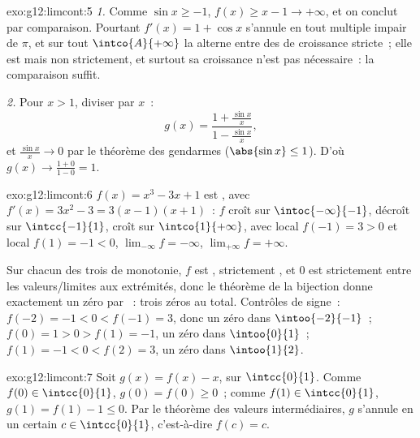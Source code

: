 \begin{solution}{exo:g12:limcont:5}
\emph{1.} Comme $\sin x \geq -1$, $f(x) \geq x - 1 \to +\infty$, et on
conclut par comparaison. Pourtant $f'(x) = 1 + \cos x$ s'annule en tout
multiple impair de $\pi$, et sur tout  $\intco{A}{+\infty}$ la
 alterne entre des  de croissance stricte~; elle est
 mais non strictement, et surtout sa croissance n'est pas
nécessaire~: la comparaison suffit.

\emph{2.} Pour $x > 1$, diviser par $x$~:
\[
g(x) = \frac{1 + \frac{\sin x}{x}}{1 - \frac{\sin x}{x}},
\]
et $\frac{\sin x}{x} \to 0$ par le théorème des gendarmes
($\abs{\sin x} \leq 1$). D'où $g(x) \to \frac{1+0}{1-0} = 1$.
\end{solution}

\begin{solution}{exo:g12:limcont:6}
$f(x) = x^3 - 3x + 1$ est , avec $f'(x) = 3x^2 - 3 = 3(x-1)(x+1)$~:
$f$ croît sur $\intoc{-\infty}{-1}$, décroît sur $\intcc{-1}{1}$, croît
sur $\intco{1}{+\infty}$, avec  local $f(-1) = 3 > 0$ et 
local $f(1) = -1 < 0$, $\lim_{-\infty} f = -\infty$,
$\lim_{+\infty} f = +\infty$.

Sur chacun des trois  de monotonie, $f$ est ,
strictement , et $0$ est strictement entre les valeurs/limites
aux extrémités, donc le théorème de la bijection donne exactement un zéro
par ~: trois zéros au total. Contrôles de signe~:
$f(-2) = -1 < 0 < f(-1) = 3$, donc un zéro dans $\intoo{-2}{-1}$~;
$f(0) = 1 > 0 > f(1) = -1$, un zéro dans $\intoo{0}{1}$~;
$f(1) = -1 < 0 < f(2) = 3$, un zéro dans $\intoo{1}{2}$.
\end{solution}

\begin{solution}{exo:g12:limcont:7}
Soit $g(x) = f(x) - x$,  sur $\intcc{0}{1}$. Comme
$f(0) \in \intcc{0}{1}$, $g(0) = f(0) \geq 0$~; comme
$f(1) \in \intcc{0}{1}$, $g(1) = f(1) - 1 \leq 0$. Par le théorème des
valeurs intermédiaires, $g$ s'annule en un certain $c \in \intcc{0}{1}$,
c'est-à-dire $f(c) = c$.
\end{solution}


